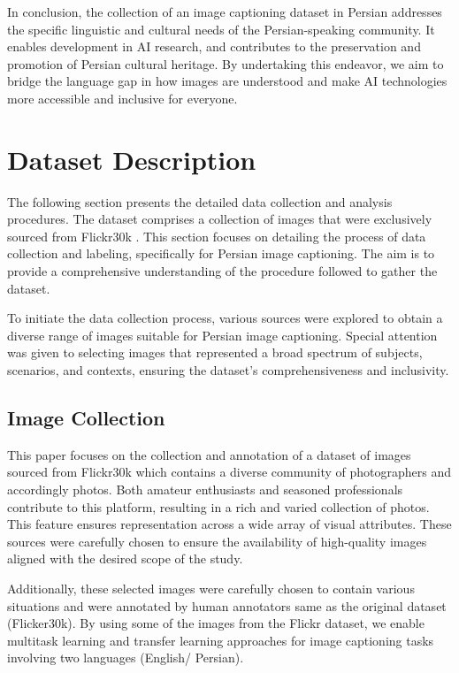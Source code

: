\documentclass[lettersize,journal]{IEEEtran}
\begin{document}
In conclusion, the collection of an image captioning dataset in Persian addresses the specific linguistic and cultural needs of the Persian-speaking community. It enables development in AI research, and contributes to the preservation and promotion of Persian cultural heritage. By undertaking this endeavor, we aim to bridge the language gap in how images are understood and make AI technologies more accessible and inclusive for everyone.

\section{Dataset Description}
The following section presents the detailed data collection and analysis procedures. The dataset comprises a collection of images that were exclusively sourced from Flickr30k \cite{Flickr30k}. This section focuses on detailing the process of data collection and labeling, specifically for Persian image captioning. The aim is to provide a comprehensive understanding of the procedure followed to gather the dataset.

To initiate the data collection process, various sources were explored to obtain a diverse range of images suitable for Persian image captioning. Special attention was given to selecting images that represented a broad spectrum of subjects, scenarios, and contexts, ensuring the dataset's comprehensiveness and inclusivity.


\subsection{Image Collection}
This paper focuses on the collection and annotation of a dataset of images sourced from Flickr30k \cite{Flickr30k} which contains a diverse community of photographers and accordingly photos. Both amateur enthusiasts and seasoned professionals contribute to this platform, resulting in a rich and varied collection of photos. This feature ensures representation across a wide array of visual attributes. These sources were carefully chosen to ensure the availability of high-quality images aligned with the desired scope of the study.

Additionally, these selected images were carefully chosen to contain various situations and were annotated by human annotators same as the original dataset (Flicker30k). By using some of the images from the Flickr dataset, we enable multitask learning and transfer learning approaches for image captioning tasks involving two languages (English/ Persian).
\end{document}
